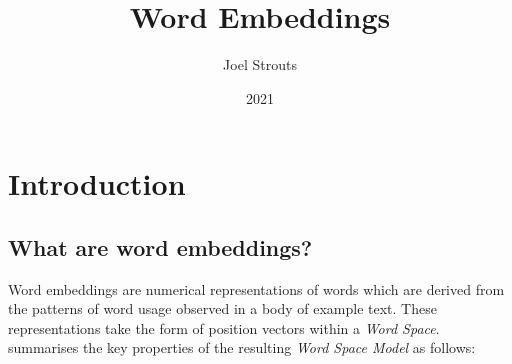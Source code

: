 \documentclass{ucetd}
\title{Word Embeddings}
\author{Joel Strouts}
\date{2021}
\begin{document}
\maketitle


\tableofcontents
\chapter*{Introduction}
\section*{What are word embeddings?}
Word embeddings are numerical representations of words which are derived from the patterns of word usage observed in a body of example text. These representations take the form of position vectors within a \textit{Word Space}. \textcite{shutze-1993-word-space} summarises the key properties of the resulting \textit{Word Space Model} as follows:
\end{document}
